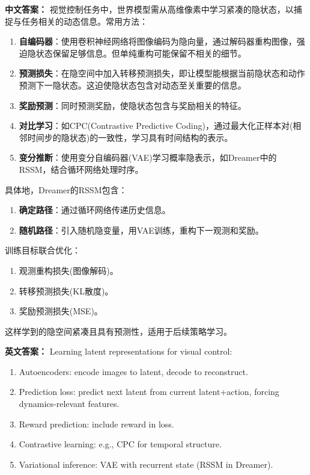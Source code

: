\documentclass[10pt,a4paper]{ctexart}
\begin{document}
\textbf{中文答案：}  
视觉控制任务中，世界模型需从高维像素中学习紧凑的隐状态，以捕捉与任务相关的动态信息。常用方法：

\begin{enumerate}
    \item \textbf{自编码器}：使用卷积神经网络将图像编码为隐向量，通过解码器重构图像，强迫隐状态保留足够信息。但单纯重构可能保留不相关的细节。
    \item \textbf{预测损失}：在隐空间中加入转移预测损失，即让模型能根据当前隐状态和动作预测下一隐状态。这迫使隐状态包含对动态至关重要的信息。
    \item \textbf{奖励预测}：同时预测奖励，使隐状态包含与奖励相关的特征。
    \item \textbf{对比学习}：如CPC(Contrastive Predictive Coding)，通过最大化正样本对(相邻时间步的隐状态)的一致性，学习具有时间结构的表示。
    \item \textbf{变分推断}：使用变分自编码器(VAE)学习概率隐表示，如Dreamer中的RSSM，结合循环网络处理时序。
\end{enumerate}

具体地，Dreamer的RSSM包含：
\begin{enumerate}
    \item \textbf{确定路径}：通过循环网络传递历史信息。
    \item \textbf{随机路径}：引入随机隐变量，用VAE训练，重构下一观测和奖励。
\end{enumerate}

训练目标联合优化：
\begin{enumerate}
    \item 观测重构损失(图像解码)。
    \item 转移预测损失(KL散度)。
    \item 奖励预测损失(MSE)。
\end{enumerate}

这样学到的隐空间紧凑且具有预测性，适用于后续策略学习。

\textbf{英文答案：}  
Learning latent representations for visual control:

\begin{enumerate}
    \item Autoencoders: encode images to latent, decode to reconstruct.
    \item Prediction loss: predict next latent from current latent+action, forcing dynamics-relevant features.
    \item Reward prediction: include reward in loss.
    \item Contrastive learning: e.g., CPC for temporal structure.
    \item Variational inference: VAE with recurrent state (RSSM in Dreamer).
\end{enumerate}
\end{document}
